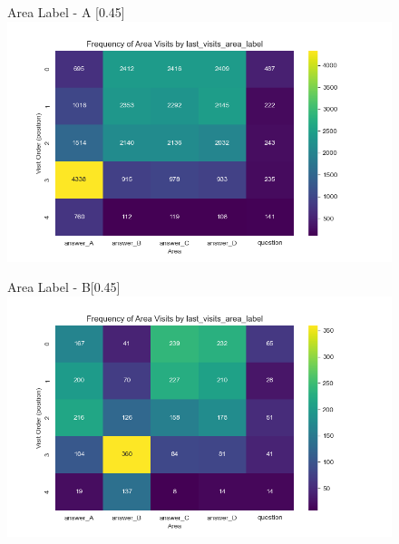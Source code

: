 \documentclass{article}
\begin{document}
\begin{figure}[H]
  \centering
  \begin{subcaptionbox}{Area Label - A \label{fig:al_a}}[0.45\textwidth]
    {\centering\includegraphics[width=\linewidth]{plots/visits/matrix_first_visits_last_visits_area_label_gatherers_A (hunters).png}}
  \end{subcaptionbox}
  \hfill
  \begin{subcaptionbox}{Area Label - B\label{fig:al_b}}[0.45\textwidth]
    {\centering\includegraphics[width=\linewidth]{plots/visits/matrix_first_visits_last_visits_area_label_gatherers_B (hunters).png}}
  \end{subcaptionbox}
  
  \vspace{1em} %


\end{figure}
\end{document}
